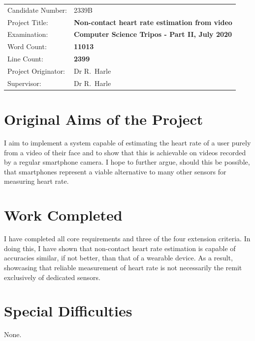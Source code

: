 \documentclass[12pt,twoside,notitlepage]{report}
\begin{document}
{\large
\begin{tabular}{ll}
Candidate Number:  &     2339B\\
Project Title:      & \bf Non-contact heart rate estimation from video \\
Examination:        & \bf Computer Science Tripos - Part II, July 2020    \\
Word Count:         & \bf 11013\footnotemark[1] \\
Line Count: & \bf 2399 \\
Project Originator: & Dr R.~Harle                    \\
Supervisor:         & Dr R.~Harle                    \\ 
\end{tabular}
}


\section*{Original Aims of the Project}
 I aim to implement a system capable of estimating the heart rate of a user purely from a video of their face and to show that this is achievable
on videos recorded by a regular smartphone camera. I hope to further argue, should this be possible, that smartphones represent a viable 
alternative to many other sensors for measuring heart rate.


\section*{Work Completed}
I have completed all core requirements and three of the four extension criteria. In doing this, I have shown that 
non-contact heart rate estimation is capable of accuracies similar, if not better, than that of a wearable device. 
As a result, showcasing that reliable measurement of heart rate is not necessarily the remit exclusively of dedicated sensors.

\section*{Special Difficulties}
None.
 
\newpage

\cleardoublepage
\end{document}
